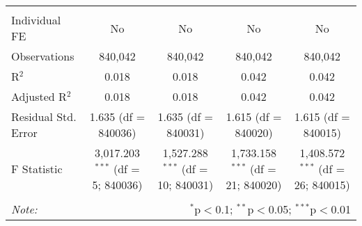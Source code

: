 \documentclass[
]{article}
\begin{document}
\begin{table}[!htbp]
{\begin{tabular}{@{\extracolsep{5pt}}lcccc}
\hline \\[-1.8ex] 
Individual FE & No & No & No & No \\ 
Observations & 840,042 & 840,042 & 840,042 & 840,042 \\ 
R$^{2}$ & 0.018 & 0.018 & 0.042 & 0.042 \\ 
Adjusted R$^{2}$ & 0.018 & 0.018 & 0.042 & 0.042 \\ 
Residual Std. Error & 1.635 (df = 840036) & 1.635 (df = 840031) & 1.615 (df = 840020) & 1.615 (df = 840015) \\ 
F Statistic & 3,017.203$^{***}$ (df = 5; 840036) & 1,527.288$^{***}$ (df = 10; 840031) & 1,733.158$^{***}$ (df = 21; 840020) & 1,408.572$^{***}$ (df = 26; 840015) \\ 
\hline 
\hline \\[-1.8ex] 
\textit{Note:}  & \multicolumn{4}{r}{$^{*}$p$<$0.1; $^{**}$p$<$0.05; $^{***}$p$<$0.01} \\ 
\end{tabular}
} 
\end{table} 
\newpage
\end{document}
